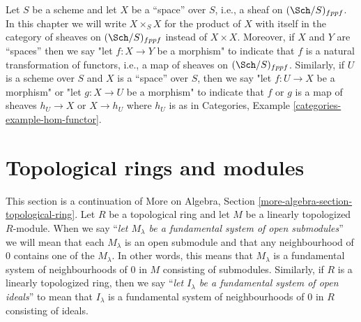 \medskip\noindent
Let $S$ be a scheme and let $X$ be a ``space'' over $S$, i.e., a sheaf on
$(\Sch/S)_{fppf}$. In this chapter we will write $X \times_S X$ for the
product of $X$ with itself in the category of sheaves on $(\Sch/S)_{fppf}$
instead of $X \times X$. Moreover, if $X$ and $Y$ are ``spaces'' then
we say "let $f : X \to Y$ be a morphism" to indicate that $f$ is a
natural transformation of functors, i.e., a map of sheaves on
$(\Sch/S)_{fppf}$. Similarly, if $U$ is a scheme over $S$ and
$X$ is a ``space'' over $S$, then we say
"let $f : U \to X$ be a morphism" or
"let $g : X \to U$ be a morphism" to indicate that $f$ or $g$
is a map of sheaves $h_U \to X$ or $X \to h_U$ where $h_U$ is as in
Categories, Example \ref{categories-example-hom-functor}.






\section{Topological rings and modules}
\label{section-topological-module}

\noindent
This section is a continuation of
More on Algebra, Section \ref{more-algebra-section-topological-ring}.
Let $R$ be a topological ring and let $M$ be a linearly topologized
$R$-module. When we say ``{\it let $M_\lambda$ be a fundamental system of
open submodules}'' we will mean that each $M_\lambda$ is an open submodule
and that any neighbourhood of $0$ contains one of the $M_\lambda$.
In other words, this means that $M_\lambda$ is a fundamental system
of neighbourhoods of $0$ in $M$ consisting of submodules.
Similarly, if $R$ is a linearly topologized ring, then we say
``{\it let $I_\lambda$ be a fundamental system of open ideals}''
to mean that $I_\lambda$ is a fundamental system
of neighbourhoods of $0$ in $R$ consisting of ideals.

